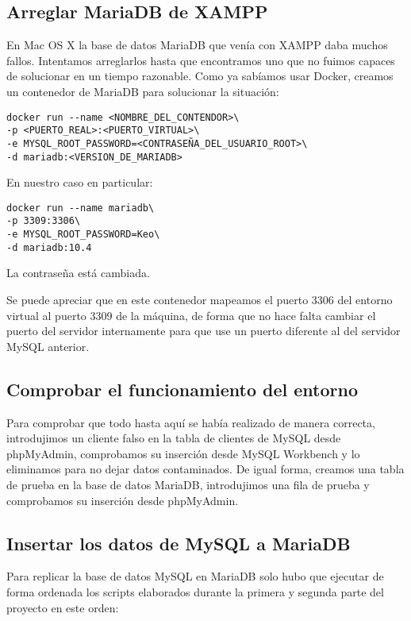 \documentclass[a4paper, 11pt, oneside]{article} %
\begin{document}
\subsection{Arreglar MariaDB de XAMPP}

En Mac OS X la base de datos MariaDB que venía con XAMPP daba muchos fallos. Intentamos arreglarlos hasta que encontramos uno que no fuimos capaces de solucionar en un tiempo razonable. Como ya sabíamos usar Docker, creamos un contenedor de MariaDB para solucionar la situación:

\begin{verbatim}
docker run --name <NOMBRE_DEL_CONTENDOR>\
-p <PUERTO_REAL>:<PUERTO_VIRTUAL>\
-e MYSQL_ROOT_PASSWORD=<CONTRASEÑA_DEL_USUARIO_ROOT>\
-d mariadb:<VERSION_DE_MARIADB>
\end{verbatim}

En nuestro caso en particular:

\begin{verbatim}
docker run --name mariadb\
-p 3309:3306\
-e MYSQL_ROOT_PASSWORD=Keo\
-d mariadb:10.4
\end{verbatim}

La contraseña está cambiada.

Se puede apreciar que en este contenedor mapeamos el puerto 3306 del entorno virtual al puerto 3309 de la máquina, de forma que no hace falta cambiar el puerto del servidor internamente para que use un puerto diferente al del servidor MySQL anterior.




\subsection{Comprobar el funcionamiento del entorno}

Para comprobar que todo hasta aquí se había realizado de manera correcta, introdujimos un cliente falso en la tabla de clientes de MySQL desde phpMyAdmin, comprobamos su inserción desde MySQL Workbench y lo eliminamos para no dejar datos contaminados. De igual forma, creamos una tabla de prueba en la base de datos MariaDB, introdujimos una fila de prueba y comprobamos su inserción desde phpMyAdmin.




\subsection{Insertar los datos de MySQL a MariaDB}

Para replicar la base de datos MySQL en MariaDB solo hubo que ejecutar de forma ordenada los scripts elaborados durante la primera y segunda parte del proyecto en este orden:
\end{document}
